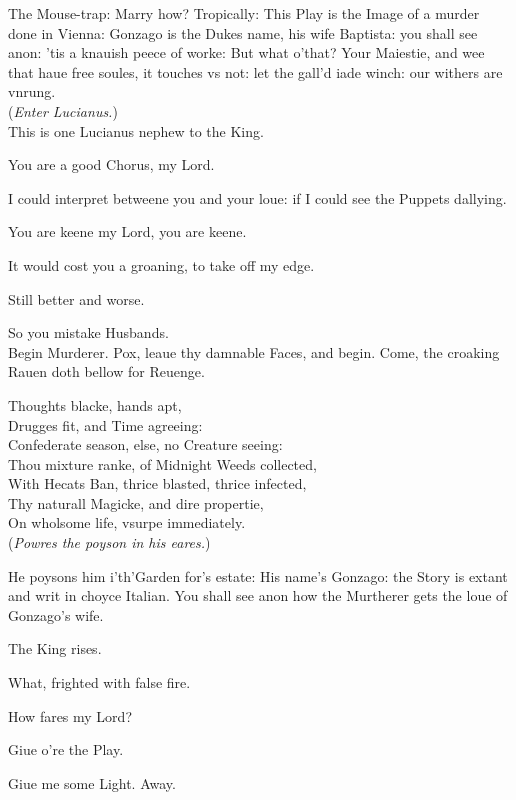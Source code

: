 \documentclass[a5paper,DIV=calc,11pt]{scrbook}
\begin{document}
\begin{drama*}
    \hamspeaks The Mouse-trap: Marry how? Tropically: This Play is the Image of a murder done in Vienna: Gonzago is the Dukes name, his wife Baptista: you shall see anon: 'tis a knauish peece of worke: But what o'that? Your Maiestie, and wee that haue free soules, it touches vs not: let the gall'd iade winch: our withers are vnrung.\\
    (\textit{Enter Lucianus.})\\
    This is one Lucianus nephew to the King.
    
    \ophespeaks You are a good Chorus, my Lord.
    
    \hamspeaks I could interpret betweene you and your loue: if I could see the Puppets dallying.
    
    \ophespeaks You are keene my Lord, you are keene.
    
    \hamspeaks It would cost you a groaning, to take off my edge.
    
    \ophespeaks Still better and worse.
    
    \hamspeaks So you mistake Husbands.\\
    Begin Murderer. Pox, leaue thy damnable Faces, and begin. Come, the croaking Rauen doth bellow for Reuenge.
    
    \playlucianus Thoughts blacke, hands apt,\\
    Drugges fit, and Time agreeing:\\
    Confederate season, else, no Creature seeing:\\
    Thou mixture ranke, of Midnight Weeds collected,\\
    With Hecats Ban, thrice blasted, thrice infected,\\
    Thy naturall Magicke, and dire propertie,\\
    On wholsome life, vsurpe immediately.\\
    (\textit{Powres the poyson in his eares.})
    
    \hamspeaks He poysons him i'th'Garden for's estate: His name's Gonzago: the Story is extant and writ in choyce Italian. You shall see anon how the Murtherer gets the loue of Gonzago's wife.
    
    \ophespeaks The King rises.
    
    \hamspeaks What, frighted with false fire.
    
    \queenspeaks How fares my Lord?
    
    \polspeaks Giue o're the Play.
    
    \kingspeaks Giue me some Light. Away.
    

\end{drama*}
\end{document}
